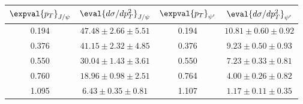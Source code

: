 \begin{tabular}{cc|cc}
\hline
$\expval{p_T}_{J/\psi}$    & $\eval{d\sigma/dp^2_T}_{J/\psi}$ & $\expval{p_T}_{\psi^\prime}$ & $\eval{d\sigma/dp^2_T}_{\psi^\prime}$ \\ \hline
\multicolumn{1}{c|}{0.194} & $47.48\pm2.66\pm5.51$            & \multicolumn{1}{c|}{0.194}   & $10.81\pm0.60\pm0.92$                \\ 
\multicolumn{1}{c|}{0.376} & $41.15\pm2.32\pm4.85$            & \multicolumn{1}{c|}{0.376}   & $9.23\pm0.50\pm0.93$                 \\ 
\multicolumn{1}{c|}{0.550} & $30.04\pm1.43\pm3.61$            & \multicolumn{1}{c|}{0.550}   & $7.23\pm0.33\pm0.81$                 \\ 
\multicolumn{1}{c|}{0.760} & $18.96\pm0.98\pm2.51$            & \multicolumn{1}{c|}{0.764}   & $4.00\pm0.26\pm0.82$                 \\
\multicolumn{1}{c|}{1.095} & $6.43\pm0.35\pm0.81$             & \multicolumn{1}{c|}{1.107}   & $1.17\pm0.11\pm0.35$                 \\ \hline 
\end{tabular}

